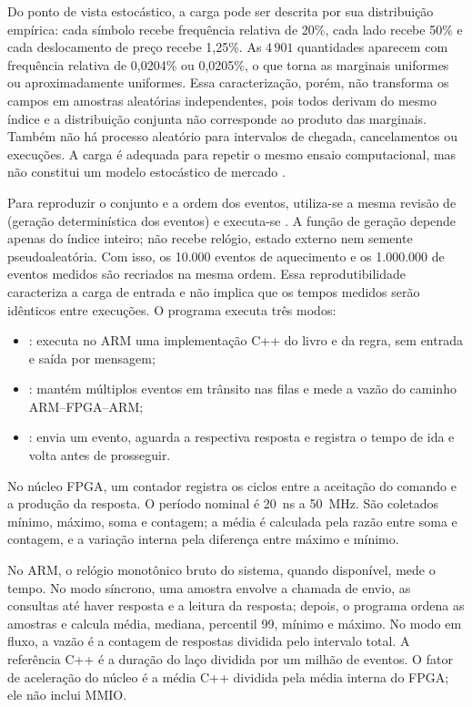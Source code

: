 Do ponto de vista estocástico, a carga pode ser descrita por sua distribuição empírica: cada símbolo recebe frequência relativa de 20\%, cada lado recebe 50\% e cada deslocamento de preço recebe 1,25\%. As $4\,901$ quantidades aparecem com frequência relativa de 0,0204\% ou 0,0205\%, o que torna as marginais uniformes ou aproximadamente uniformes. Essa caracterização, porém, não transforma os campos em amostras aleatórias independentes, pois todos derivam do mesmo índice e a distribuição conjunta não corresponde ao produto das marginais. Também não há processo aleatório para intervalos de chegada, cancelamentos ou execuções. A carga é adequada para repetir o mesmo ensaio computacional, mas não constitui um modelo estocástico de mercado \cite{Cont2010,Gould2013}.

Para reproduzir o conjunto e a ordem dos eventos, utiliza-se a mesma revisão de  (geração determinística dos eventos) e executa-se . A função de geração depende apenas do índice inteiro; não recebe relógio, estado externo nem semente pseudoaleatória. Com isso, os 10.000 eventos de aquecimento e os 1.000.000 de eventos medidos são recriados na mesma ordem. Essa reprodutibilidade caracteriza a carga de entrada e não implica que os tempos medidos serão idênticos entre execuções. O programa executa três modos:

\begin{itemize}
  \item {}: executa no ARM uma implementação C++ do livro e da regra, sem entrada e saída por mensagem;
  \item {}: mantém múltiplos eventos em trânsito nas filas e mede a vazão do caminho ARM--FPGA--ARM;
  \item {}: envia um evento, aguarda a respectiva resposta e registra o tempo de ida e volta antes de prosseguir.
\end{itemize}

No núcleo FPGA, um contador registra os ciclos entre a aceitação do comando e a produção da resposta. O período nominal é 20~ns a 50~MHz. São coletados mínimo, máximo, soma e contagem; a média é calculada pela razão entre soma e contagem, e a variação interna pela diferença entre máximo e mínimo.

No ARM, o relógio monotônico bruto do sistema, quando disponível, mede o tempo. No modo síncrono, uma amostra envolve a chamada de envio, as consultas até haver resposta e a leitura da resposta; depois, o programa ordena as amostras e calcula média, mediana, percentil 99, mínimo e máximo. No modo em fluxo, a vazão é a contagem de respostas dividida pelo intervalo total. A referência C++ é a duração do laço dividida por um milhão de eventos. O fator de aceleração do núcleo é a média C++ dividida pela média interna do FPGA; ele não inclui MMIO.

